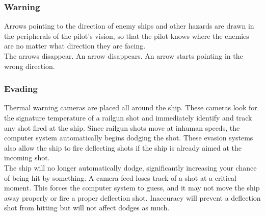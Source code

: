 \documentclass[a4paper]{article}
\begin{document}
\vspace{-0.5cm} \hspace{-18pt} \subsubsection{Warning} \label{fighter_warning} \vspace{-0.2cm}
Arrows pointing to the direction of enemy ships and other hazards are drawn in the peripherals of the pilot's vision, so that the pilot knows where the enemies are no matter what direction they are facing.
\\ \cci
{The arrows disappear.}
{An arrow disappears.}
{An arrow starts pointing in the wrong direction.}

\vspace{-0.5cm} \hspace{-18pt} \subsubsection{Evading} \label{fighter_evading} \vspace{-0.2cm}
Thermal warning cameras are placed all around the ship. These cameras look for the signature temperature of a railgun shot and immediately identify and track any shot fired at the ship. Since railgun shots move at inhuman speeds, the computer system automatically begins dodging the shot. These evasion systems also allow the ship to fire deflecting shots if the ship is already aimed at the incoming shot.
\\ \cci
{The ship will no longer automatically dodge, significantly increasing your chance of being hit by something.}
{A camera feed loses track of a shot at a critical moment. This forces the computer system to guess, and it may not move the ship away properly or fire a proper deflection shot.}
{Inaccuracy will prevent a deflection shot from hitting but will not affect dodges as much.}
\end{document}
